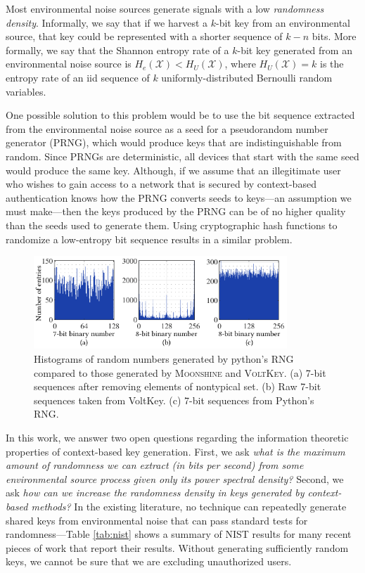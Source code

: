 \documentclass[10pt,onecolumn]{article}
\begin{document}
Most environmental noise sources generate signals with a low \emph{randomness density}.
Informally, we say that if we harvest a $k$-bit key from an environmental source, that key could be represented with a shorter sequence of $k-n$ bits.
More formally, we say that the Shannon entropy rate of a $k$-bit key generated from an environmental noise source is $H_e(\mathcal{X}) < H_U(\mathcal{X})$, where $H_U(\mathcal{X}) = k$ is the entropy rate of an iid sequence of $k$ uniformly-distributed Bernoulli random variables.


One possible solution to this problem would be to use the bit sequence extracted from the environmental noise source as a seed for a pseudorandom number generator (PRNG), which would produce keys that are indistinguishable from random.
Since PRNGs are deterministic, all devices that start with the same seed would produce the same key.
Although, if we assume that an illegitimate user who wishes to gain access to a network that is secured by context-based authentication knows how the PRNG converts seeds to keys---an assumption we must make---then the keys produced by the PRNG can be of no higher quality than the seeds used to generate them.
Using cryptographic hash functions to randomize a low-entropy bit sequence results in a similar problem.



\begin{figure}
\centering
\includegraphics[width=3.75in]{figures/graph2.pdf}
\caption{Histograms of random numbers generated by python's RNG compared to those generated by \textsc{Moonshine} and \textsc{VoltKey}. (a) 7-bit sequences after removing elements of nontypical set. (b) Raw 7-bit sequences taken from VoltKey. (c) 7-bit sequences from Python's RNG.}
\label{fig:introduction}
\end{figure}


In this work, we answer two open questions regarding the information theoretic properties of context-based key generation.
First, we ask \emph{what is the maximum amount of randomness we can extract (in bits per second) from some environmental source process given only its power spectral density?}
Second, we ask \emph{how can we increase the randomness density in keys generated by context-based methods?}
In the existing literature, no technique can repeatedly generate shared keys from environmental noise that can pass standard tests for randomness---Table \ref{tab:nist} shows a summary of NIST results for many recent pieces of work that report their results.
Without generating sufficiently random keys, we cannot be sure that we are excluding unauthorized users.
\end{document}
